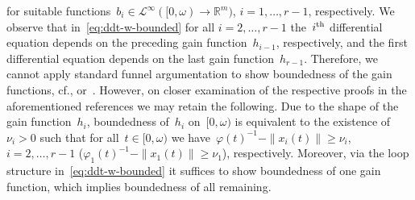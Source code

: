 \documentclass[ envcountsect, envcountsame]{svjour3}
\newcommand{\R}{\mathbb{R}}
\newcommand{\cL}{\mathcal{L}}
\newcommand{\vp}{\varphi}
\begin{document}
for suitable functions~$b_i \in \cL^\infty([0,\omega) \to \R^m)$, $i=1,\ldots,r-1$, respectively.
We observe that in~\eqref{eq:ddt-w-bounded} for all $i=2,\ldots,r-1$ the~$i^{\rm th}$ differential equation depends on the preceding gain function~$h_{i-1}$, respectively, and the first differential equation depends on the last gain function~$h_{r-1}$.
Therefore, we cannot apply standard funnel argumentation to show boundedness of the gain functions, cf.\cite[p. 484-485]{IlchRyan02b}, 
\cite[p. 241-242]{Ilch13} or~\cite[p. 350-351]{BergLe18a}.
However, on closer examination of the respective proofs in the aforementioned references we may retain the following. 
Due to the shape of the gain function~$h_i$, boundedness of~$h_i$ on~$[0,\omega)$ is equivalent to the existence of ${\nu_i > 0}$ such that for all~$t \in [0,\omega)$ 
we have~${\vp(t)^{-1} - \|x_i(t)\| \ge \nu_i}$, $i=2,\ldots,r-1$ (${\vp_1(t)^{-1} - \|x_1(t)\| \ge \nu_1}$), respectively.
Moreover, via the loop structure in~\eqref{eq:ddt-w-bounded} it suffices to show boundedness of one gain function, which implies boundedness of all remaining.

%
\end{document}
